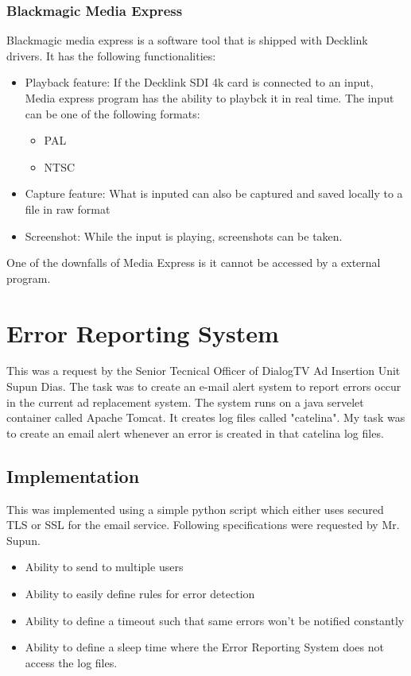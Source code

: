 \subsubsection{Blackmagic Media Express}
Blackmagic media express is a software tool that is shipped with Decklink drivers. It has the following functionalities:

\begin{itemize}
\item Playback feature: If the Decklink SDI 4k card is connected to an input, Media express program has the ability to playbck it in real time. The input can be one of the following formats:
	\begin{itemize}
	\item PAL
	\item NTSC
	\end{itemize}

\item Capture feature: What is inputed can also be captured and saved locally to a file in raw format

\item Screenshot: While the input is playing, screenshots can be taken.
\end{itemize}

One of the downfalls of Media Express is it cannot be accessed by a external program.

\section{Error Reporting System}

This was a request by the Senior Tecnical Officer of DialogTV Ad Insertion Unit Supun Dias. The task was to create an e-mail alert system to report errors occur in the current ad replacement system. The system runs on a java servelet container called Apache Tomcat. It creates log files called "catelina". My task was to create an email alert whenever an error is created in that catelina log files. 

\subsection{Implementation}

This was implemented using a simple python script which either uses secured TLS or SSL for the email service. Following specifications were requested by Mr. Supun.

\begin{itemize}
\item Ability to send to multiple users
\item Ability to easily define rules for error detection
\item Ability to define a timeout such that same errors won't be notified constantly
\item Ability to define a sleep time where the Error Reporting System does not access the log files.
\end{itemize}

